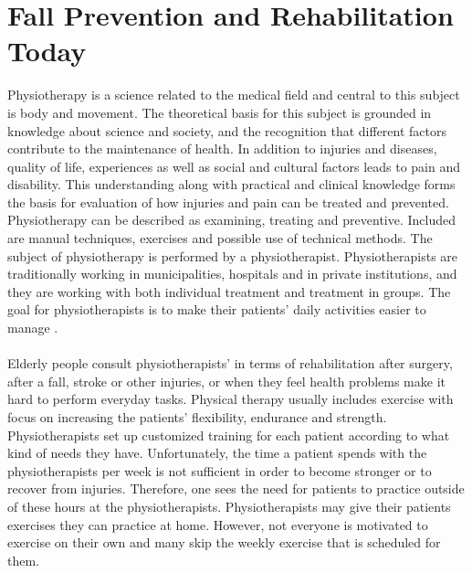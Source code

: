 \section{Fall Prevention and Rehabilitation Today}
Physiotherapy is a science related to the medical field and central to this subject is body and movement. The theoretical basis for this subject is grounded in knowledge about science and society, and the recognition that different factors contribute to the maintenance of health. In addition to injuries and diseases, quality of life, experiences as well as social and cultural factors leads to pain and disability. This understanding along with practical and clinical knowledge forms the basis for evaluation of how injuries and pain can be treated and prevented. Physiotherapy can be described as examining, treating and preventive. Included are manual techniques, exercises and possible use of technical methods. The subject of physiotherapy is performed by a physiotherapist. Physiotherapists are traditionally working in municipalities, hospitals and in private institutions, and they are working with both individual treatment and treatment in groups. The goal for physiotherapists is to make their patients’ daily activities easier to manage \cite{physiotherapy1}\cite{physiotherapy2}.\\ \\
Elderly people consult physiotherapists' in terms of rehabilitation after surgery, after a fall, stroke or other injuries, or when they feel health problems make it hard to perform everyday tasks. Physical therapy usually includes exercise with focus on increasing the patients’ flexibility, endurance and strength. Physiotherapists set up customized training for each patient according to what kind of needs they have. Unfortunately, the time a patient spends with the physiotherapists per week is not sufficient in order to become stronger or to recover from injuries. Therefore, one sees the need for patients to practice outside of these hours at the physiotherapists. Physiotherapists may give their patients exercises they can practice at home. However, not everyone is motivated to exercise on their own and many skip the weekly exercise that is scheduled for them. \cite{physiotherapy2} 


